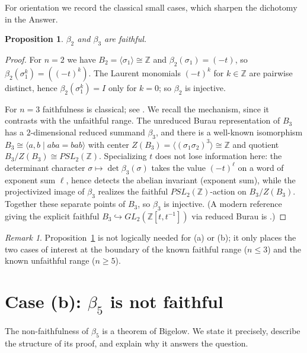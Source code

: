 \documentclass{amsart}
\newtheorem{proposition}{Proposition}
\theoremstyle{remark}
\newtheorem{remark}{Remark}
\begin{document}
For orientation we record the classical small cases, which sharpen the
dichotomy in the Answer.

\begin{proposition}\label{prop:small}
$\beta_2$ and $\beta_3$ are faithful.
\end{proposition}

\begin{proof}
For $n=2$ we have $B_2=\langle\sigma_1\rangle\cong\mathbb Z$ and
$\beta_2(\sigma_1)=(-t)$, so $\beta_2(\sigma_1^k)=((-t)^k)$. The Laurent
monomials $(-t)^k$ for $k\in\mathbb Z$ are pairwise distinct, hence
$\beta_2(\sigma_1^k)=I$ only for $k=0$; so $\beta_2$ is injective.

For $n=3$ faithfulness is classical; see
\cite[Thm.~3.15 and \S3.3]{KasselTuraev}. We recall the mechanism, since it
contrasts with the unfaithful range. The unreduced Burau representation of
$B_3$ has a $2$-dimensional reduced summand $\beta_3$, and there is a
well-known isomorphism $B_3\cong\langle a,b\mid aba=bab\rangle$ with center
$Z(B_3)=\langle(\sigma_1\sigma_2)^3\rangle\cong\mathbb Z$ and quotient
$B_3/Z(B_3)\cong PSL_2(\mathbb Z)$. Specializing $t$ does not lose information
here: the determinant character $\sigma\mapsto\det\beta_3(\sigma)$ takes the
value $(-t)^{\ell}$ on a word of exponent sum $\ell$, hence detects the abelian
invariant (exponent sum), while the projectivized image of $\beta_3$ realizes
the faithful $PSL_2(\mathbb Z)$-action on $B_3/Z(B_3)$. Together these separate
points of $B_3$, so $\beta_3$ is injective. (A modern reference giving the
explicit faithful $B_3\hookrightarrow GL_2(\mathbb Z[t,t^{-1}])$ via reduced
Burau is \cite[\S3.3]{KasselTuraev}.)
\end{proof}

\begin{remark}
Proposition~\ref{prop:small} is not logically needed for (a) or (b); it only
places the two cases of interest at the boundary of the known faithful range
($n\le3$) and the known unfaithful range ($n\ge5$).
\end{remark}

\section{Case (b): $\beta_5$ is not faithful}

The non-faithfulness of $\beta_5$ is a theorem of Bigelow. We state it
precisely, describe the structure of its proof, and explain why it answers the
question.
\end{document}
